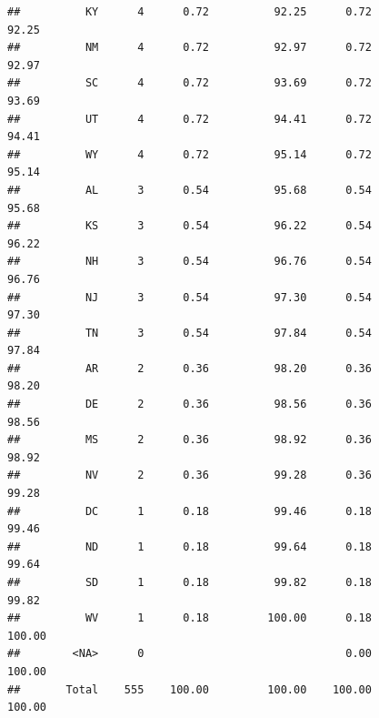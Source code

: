 \documentclass[]{article}
\newenvironment{Shaded}{\begin{snugshade}}{\end{snugshade}}
\newcommand{\KeywordTok}[1]{\textcolor[rgb]{0.13,0.29,0.53}{\textbf{#1}}}
\newcommand{\DataTypeTok}[1]{\textcolor[rgb]{0.13,0.29,0.53}{#1}}
\newcommand{\FloatTok}[1]{\textcolor[rgb]{0.00,0.00,0.81}{#1}}
\newcommand{\StringTok}[1]{\textcolor[rgb]{0.31,0.60,0.02}{#1}}
\newcommand{\CommentTok}[1]{\textcolor[rgb]{0.56,0.35,0.01}{\textit{#1}}}
\newcommand{\OtherTok}[1]{\textcolor[rgb]{0.56,0.35,0.01}{#1}}
\newcommand{\OperatorTok}[1]{\textcolor[rgb]{0.81,0.36,0.00}{\textbf{#1}}}
\newcommand{\NormalTok}[1]{#1}
\begin{document}
\begin{verbatim}
##          KY      4      0.72          92.25      0.72          92.25
##          NM      4      0.72          92.97      0.72          92.97
##          SC      4      0.72          93.69      0.72          93.69
##          UT      4      0.72          94.41      0.72          94.41
##          WY      4      0.72          95.14      0.72          95.14
##          AL      3      0.54          95.68      0.54          95.68
##          KS      3      0.54          96.22      0.54          96.22
##          NH      3      0.54          96.76      0.54          96.76
##          NJ      3      0.54          97.30      0.54          97.30
##          TN      3      0.54          97.84      0.54          97.84
##          AR      2      0.36          98.20      0.36          98.20
##          DE      2      0.36          98.56      0.36          98.56
##          MS      2      0.36          98.92      0.36          98.92
##          NV      2      0.36          99.28      0.36          99.28
##          DC      1      0.18          99.46      0.18          99.46
##          ND      1      0.18          99.64      0.18          99.64
##          SD      1      0.18          99.82      0.18          99.82
##          WV      1      0.18         100.00      0.18         100.00
##        <NA>      0                               0.00         100.00
##       Total    555    100.00         100.00    100.00         100.00
\end{verbatim}

\begin{Shaded}
\end{Shaded}
\end{document}

